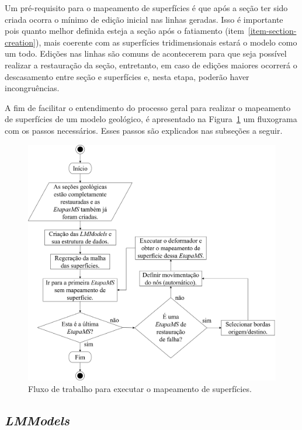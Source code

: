 Um pré-requisito para o mapeamento de superfícies é que após a seção ter sido criada ocorra o mínimo de edição inicial nas linhas geradas. Isso é importante pois quanto melhor definida esteja a seção após o fatiamento (item~\ref{item-section-creation}), mais coerente com as superfícies tridimensionais estará o modelo como um todo. Edições nas linhas são comuns de acontecerem para que seja possível realizar a restauração da seção, entretanto, em caso de edições maiores ocorrerá o descasamento entre seção e superfícies e, nesta etapa, poderão haver incongruências.

A fim de facilitar o entendimento do processo geral para realizar o mapeamento de superfícies de um modelo geológico, é apresentado na Figura~\ref{fig-surface-mapping-workflow} um fluxograma com os passos necessários. Esses passos são explicados nas subseções a seguir.

\begin{figure} [H]
  \begin{center}
    \includegraphics[width=\textwidth]{images/fig-surface-mapping-workflow}
    \caption{Fluxo de trabalho para executar o mapeamento de superfícies.}\label{fig-surface-mapping-workflow}
  \end{center}
\end{figure}

\subsection{\textit{LMModels}}\label{lmmodels-surface-map}

